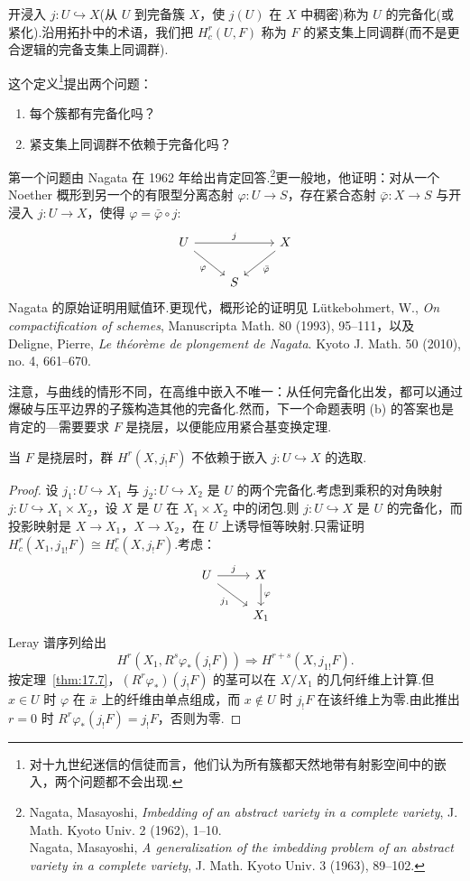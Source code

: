 开浸入 $j \colon U \hookrightarrow X$(从 $U$ 到完备簇 $X$，使 $j(U)$ 在 $X$ 中稠密)称为 $U$ 的完备化(或紧化).沿用拓扑中的术语，我们把 $H^{r}_{c}(U, F)$ 称为 $F$ 的紧支集上同调群(而不是更合逻辑的完备支集上同调群).

这个定义\footnote{对十九世纪迷信的信徒而言，他们认为所有簇都天然地带有射影空间中的嵌入，两个问题都不会出现.}提出两个问题：
\begin{enumerate}
  \item 每个簇都有完备化吗？
  \item 紧支集上同调群不依赖于完备化吗？
\end{enumerate}
第一个问题由 Nagata 在 1962 年给出肯定回答.\footnote{Nagata, Masayoshi, \emph{Imbedding of an abstract variety in a complete variety}, J. Math. Kyoto Univ. 2 (1962), 1--10.\\
Nagata, Masayoshi, \emph{A generalization of the imbedding problem of an abstract variety in a complete variety}, J. Math. Kyoto Univ. 3 (1963), 89--102.}更一般地，他证明：对从一个 Noether 概形到另一个的有限型分离态射 $\varphi \colon U \to S$，存在紧合态射 $\bar{\varphi} \colon X \to S$ 与开浸入 $j \colon U \to X$，使得 $\varphi = \bar{\varphi} \circ j$:
\[
\begin{tikzcd}
U \arrow[rr, "j"] \arrow[rd, "\varphi"'] & & X \arrow[ld, "\bar{\varphi}"] \\
& S &
\end{tikzcd}
\]
Nagata 的原始证明用赋值环.更现代，概形论的证明见 L\"utkebohmert, W., \emph{On compactification of schemes}, Manuscripta Math. 80 (1993), 95--111，以及 Deligne, Pierre, \emph{Le th\'eor\`eme de plongement de Nagata}. Kyoto J. Math. 50 (2010), no. 4, 661--670.

注意，与曲线的情形不同，在高维中嵌入不唯一：从任何完备化出发，都可以通过爆破与压平边界的子簇构造其他的完备化.然而，下一个命题表明 (b) 的答案也是肯定的---需要要求 $F$ 是挠层，以便能应用紧合基变换定理.

\begin{proposition}\label{prop:18.2}
当 $F$ 是挠层时，群 $H^{r}(X, j_{!}F)$ 不依赖于嵌入 $j \colon U \hookrightarrow X$ 的选取.
\end{proposition}

\begin{proof}
设 $j_1 \colon U \hookrightarrow X_1$ 与 $j_2 \colon U \hookrightarrow X_2$ 是 $U$ 的两个完备化.考虑到乘积的对角映射 $j \colon U \hookrightarrow X_1 \times X_2$，设 $X$ 是 $U$ 在 $X_1 \times X_2$ 中的闭包.则 $j \colon U \hookrightarrow X$ 是 $U$ 的完备化，而投影映射是 $X \to X_1$，$X \to X_2$，在 $U$ 上诱导恒等映射.只需证明 $H^{r}_{c}(X_1, j_{1!}F) \cong H^{r}_{c}(X, j_{!}F)$.考虑：
\[
\begin{tikzcd}
U \arrow[r, "j"] \arrow[rd, "j_1"'] & X \arrow[d, "\varphi"] \\
& X_1
\end{tikzcd}
\]
Leray 谱序列给出
\[
H^{r}(X_1, R^{s}\varphi_*(j_{!}F)) \Rightarrow H^{r+s}(X, j_{1!}F).
\]
按定理~\ref{thm:17.7}，$(R^{r}\varphi_*)(j_{!}F)$ 的茎可以在 $X/X_1$ 的几何纤维上计算.但 $x \in U$ 时 $\varphi$ 在 $\bar{x}$ 上的纤维由单点组成，而 $x \notin U$ 时 $j_{!}F$ 在该纤维上为零.由此推出 $r = 0$ 时 $R^{r}\varphi_*(j_{!}F) = j_{!}F$，否则为零.
\end{proof}

